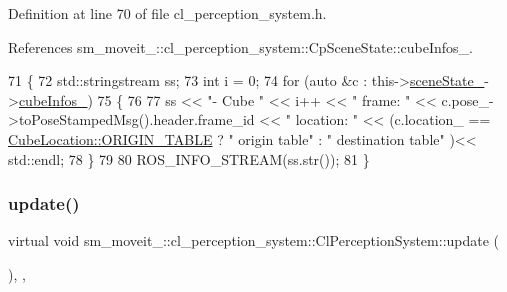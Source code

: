 Definition at line 70 of file cl\+\_\+perception\+\_\+system.\+h.



References sm\+\_\+moveit\+\_\+::cl\+\_\+perception\+\_\+system\+::\+Cp\+Scene\+State\+::cube\+Infos\+\_\+.


\begin{DoxyCode}
71             \{
72                 std::stringstream ss;
73                 \textcolor{keywordtype}{int} i = 0;
74                 \textcolor{keywordflow}{for} (\textcolor{keyword}{auto} &c : this->\hyperlink{classsm__moveit__4_1_1cl__perception__system_1_1ClPerceptionSystem_a82ea8feeb2fa43349f91ed59137b3890}{sceneState\_}->\hyperlink{classsm__moveit__4_1_1cl__perception__system_1_1CpSceneState_a734a45934cccf19ac5c886cd94bc8cda}{cubeInfos\_})
75                 \{
76 
77                     ss << \textcolor{stringliteral}{"- Cube "} << i++ << \textcolor{stringliteral}{" frame: "} << c.pose\_->toPoseStampedMsg().header.frame\_id << \textcolor{stringliteral}{
      " location: "} << (c.location\_ == \hyperlink{namespacesm__moveit__4_1_1cl__perception__system_a0d1b8834532a7cf9d19670791eece6d1ae5ee34c3ef8ec4a46a00a218416c7b1d}{CubeLocation::ORIGIN\_TABLE} ? \textcolor{stringliteral}{" origin table"} : \textcolor{stringliteral}{"
       destination table"} )<< std::endl;
78                 \}
79 
80                 ROS\_INFO\_STREAM(ss.str());
81             \}
\end{DoxyCode}
\mbox{\label{classsm__moveit__4_1_1cl__perception__system_1_1ClPerceptionSystem_a91de8cf71c93738f8bcbea388c84a5dd}} 
\subsubsection{\texorpdfstring{update()}{update()}}
{\footnotesize\ttfamily virtual void sm\+\_\+moveit\+\_\+::cl\+\_\+perception\+\_\+system\+::\+Cl\+Perception\+System\+::update (\begin{DoxyParamCaption}{ }\end{DoxyParamCaption})\hspace{0.3cm}{\ttfamily [inline]}, {\ttfamily [override]}, {\ttfamily [virtual]}}



